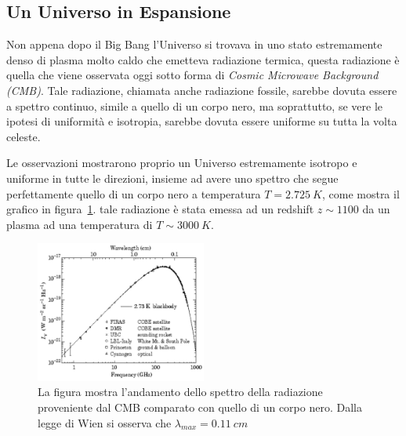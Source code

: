 \subsection{Un Universo in Espansione}\label{sec:unverso-espansione}
Non appena dopo il Big Bang l'Universo si trovava in uno stato estremamente denso di plasma molto caldo che emetteva radiazione termica, questa radiazione è quella che viene osservata oggi sotto forma di \textit{Cosmic Microwave Background (CMB)}. Tale radiazione, chiamata anche radiazione fossile, sarebbe dovuta essere a spettro continuo, simile a quello di un corpo nero, ma soprattutto, se vere le ipotesi di uniformità e isotropia, sarebbe dovuta essere uniforme su tutta la volta celeste. 

Le osservazioni mostrarono proprio un Universo estremamente isotropo e uniforme in tutte le direzioni, insieme ad avere uno spettro che segue perfettamente quello di un corpo nero a temperatura $T = \SI{2.725}{K}$, come mostra il grafico in figura~\ref{fig:balckbody-universe}. tale radiazione è stata emessa ad un redshift $z \sim 1100$ da un plasma ad una temperatura di $T \sim \SI{3000}{K}$.
\begin{figure}
    \centering
    \includegraphics[width = 0.5\textwidth]{immagini/blackbody-universe.png}
    \caption{La figura mostra l'andamento dello spettro della radiazione proveniente dal CMB comparato con quello di un corpo nero. Dalla legge di Wien si osserva che $\lambda_{max}= \SI{0.11}{cm}$}\label{fig:balckbody-universe}
\end{figure}

